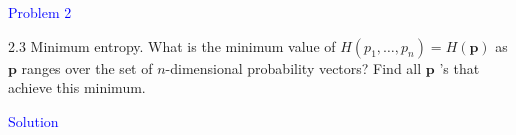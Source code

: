 \textcolor{blue}{Problem 2}

2.3 Minimum entropy. What is the minimum value of $H\left(p_1, \ldots, p_n\right)=H(\mathbf{p})$ as $\mathbf{p}$ ranges over the set of $n$-dimensional probability vectors? Find all $\mathbf{p}$ 's that achieve this minimum.

\textcolor{blue}{Solution}



\newpage